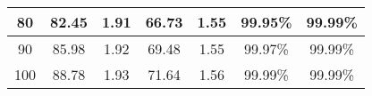 \begin{table}[!htb]
\begin{tabular}{|c|c|c|c|c|c|c|}
  80                          &                   82.45 &                    1.91 &                         66.73 &                    1.55 &                 99.95\% &                 99.99\% \\ \hline
  90                          &                   85.98 &                    1.92 &                         69.48 &                    1.55 &                 99.97\% &                 99.99\% \\ \hline
  100                         &                   88.78 &                    1.93 &                         71.64 &                    1.56 &                 99.99\% &                 99.99\% \\ \hline
  \end{tabular}
\end{table}